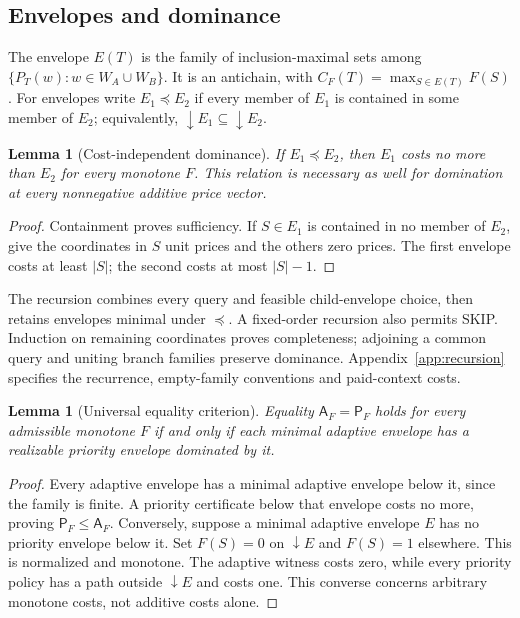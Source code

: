 \documentclass[pdflatex,sn-mathphys-num]{sn-jnl}
\newcommand{\A}{\mathsf{A}}
\newcommand{\Pcost}{\mathsf{P}}
\newcommand{\down}{\mathop{\downarrow}}
\theoremstyle{thmstyleone}
\newtheorem{lemma}[theorem]{Lemma}
\theoremstyle{thmstylethree}
\theoremstyle{thmstyletwo}
\begin{document}
\subsection{Envelopes and dominance}\label{sec:envelopes}
The envelope $E(T)$ is the family of inclusion-maximal sets among $\{P_T(w):w\in W_A\cup W_B\}$. It is an antichain, with $C_F(T)=\max_{S\in E(T)}F(S)$. For envelopes write $E_1\preceq E_2$ if every member of $E_1$ is contained in some member of $E_2$; equivalently, $\down E_1\subseteq\down E_2$.

\begin{lemma}[Cost-independent dominance]\label{lem:dominance}
If $E_1\preceq E_2$, then $E_1$ costs no more than $E_2$ for every monotone $F$. This relation is necessary as well for domination at every nonnegative additive price vector.
\end{lemma}
\begin{proof}
Containment proves sufficiency. If $S\in E_1$ is contained in no member of $E_2$, give the coordinates in $S$ unit prices and the others zero prices. The first envelope costs at least $|S|$; the second costs at most $|S|-1$.
\end{proof}

The recursion combines every query and feasible child-envelope choice, then retains envelopes minimal under $\preceq$. A fixed-order recursion also permits SKIP. Induction on remaining coordinates proves completeness; adjoining a common query and uniting branch families preserve dominance. Appendix~\ref{app:recursion} specifies the recurrence, empty-family conventions and paid-context costs.

\begin{lemma}[Universal equality criterion]\label{lem:criterion}
Equality $\A_F=\Pcost_F$ holds for every admissible monotone $F$ if and only if each minimal adaptive envelope has a realizable priority envelope dominated by it.
\end{lemma}
\begin{proof}
Every adaptive envelope has a minimal adaptive envelope below it, since the family is finite. A priority certificate below that envelope costs no more, proving $\Pcost_F\leq\A_F$. Conversely, suppose a minimal adaptive envelope $E$ has no priority envelope below it. Set $F(S)=0$ on $\down E$ and $F(S)=1$ elsewhere. This is normalized and monotone. The adaptive witness costs zero, while every priority policy has a path outside $\down E$ and costs one. This converse concerns arbitrary monotone costs, not additive costs alone.
\end{proof}
\end{document}
